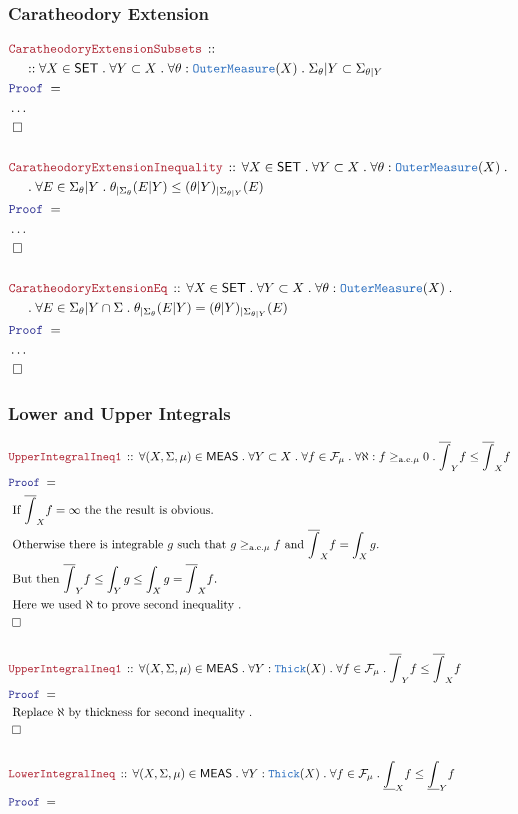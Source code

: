 \documentclass[12pt]{scrartcl}
\newcommand{\TYPE}[1]{\textcolor{NavyBlue}{\mathtt{#1}}}
\newcommand{\LOGIC}[1]{\textcolor{Blue}{\mathtt{#1}}}
\newcommand{\THM}[1]{\textcolor{Maroon}{\mathtt{#1}}}
\renewcommand{\.}{\; . \;}
\newcommand{\Theorem}[2]{& \THM{#1} \, :: \, #2 \\ & \Proof = \\ }
\newcommand{\NewLine}{\\ & \kern 1pc}
\newcommand{\Page}[1]{ \begin{align*} #1 \end{align*}   }
\newcommand{\NoProof}{ & \ldots \\ \EndProof}
\newcommand{\QED}{\; \square}
\newcommand{\EndProof}{& \QED \\}
\newcommand{\Proof}{\LOGIC{Proof} \; }
\newcommand{\Explain}[1]{& \text{#1.} \\}
\newcommand{\SET}{\mathsf{SET}}
\renewcommand{\ae}{\mathrm{a.e.}}
\newcommand{\OM}{\TYPE{OuterMeasure}}
\newcommand{\Thick}{\TYPE{Thick}}
\newcommand{\F}{\mathcal{F}}
\newcommand{\MEAS}{\mathsf{MEAS}}
\begin{document}
\subsubsection{Caratheodory Extension}
\Page{
	\Theorem{CaratheodoryExtensionSubsets}
	{
		\NewLine ::	
		\forall X \in \SET \.
		\forall Y \subset X \.
		\forall \theta : \OM(X) \.
		\Sigma_\theta|Y \subset \Sigma_{\theta|Y}
	}
	\NoProof
	\\
	\Theorem{CaratheodoryExtensionInequality}
	{
		\forall X \in \SET \.
		\forall Y \subset X \.
		\forall \theta : \OM(X) \.
		 \NewLine \.
		\forall E \in \Sigma_\theta|Y \.
		\theta_{|\Sigma_\theta}(E|Y) \le (\theta|Y)_{|\Sigma_{\theta|Y}}(E)
	}
	\NoProof
	\\
	\Theorem{CaratheodoryExtensionEq}
	{
		\forall X \in \SET \.
		\forall Y \subset X \.
		\forall \theta : \OM(X) \.
	     \NewLine \.
		\forall E \in \Sigma_\theta|Y \cap \Sigma \.
		\theta_{|\Sigma_\theta}(E|Y) = (\theta|Y)_{|\Sigma_{\theta|Y}}(E)
	}
	\NoProof
}
\newpage
\subsubsection{Lower and Upper Integrals}
\Page{
	\Theorem{UpperIntegralIneq1}
	{
		\forall (X,\Sigma,\mu) \in \MEAS \.
		\forall Y \subset X \.
		\forall f \in \F_\mu \.
		\forall \aleph : f \ge_{\ae \mu} 0 \.
		\overline{\int}_Y f \le \overline{\int}_X f
	}
	\Explain{ 
		If $\overline{\int}_X f = \infty$ the the result is obvious}
	\Explain{ 
		Otherwise there is integrable $g$ such that $g \ge_{\ae \mu} f$ and $\overline{\int}_X f = \int_X g$}
	\Explain{
		But then $\overline{\int}_Y f \le \int_Y g \le \int_X g = \overline{\int}_X f$}
	\Explain{
		Here we used $\aleph$ to prove second inequality
	}
	\EndProof
	\\
	\Theorem{UpperIntegralIneq1}
	{
		\forall (X,\Sigma,\mu) \in \MEAS \.
		\forall Y : \Thick(X) \.
		\forall f \in \F_\mu \.
		\overline{\int}_Y f \le \overline{\int}_X f
	}
	\Explain{
		Replace $\aleph$ by thickness for second inequality
	}
	\EndProof
	\\
	\Theorem{LowerIntegralIneq}
	{
		\forall (X,\Sigma,\mu) \in \MEAS \.
		\forall Y : \TYPE{Thick}(X) \.
		\forall f \in \F_\mu \.
		\underline{\int}_X f \le \underline{\int}_Y f
	}
}
\newpage
\end{document}
